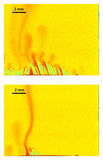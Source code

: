 \begin{figure}[htbp]
\centering
  \begin{subfigure}{0.3\textwidth}
    \centering
	\includegraphics[width=\textwidth]{Chapter4/Graphics/freckle_exp/exp_pulsing.png}
	\caption{}
    \label{fig:exp_pulsing}
  \end{subfigure}
  \begin{subfigure}{0.3\textwidth}
    \centering
	\includegraphics[width=\textwidth]{Chapter4/Graphics/freckle_exp/exp_continuous.png}
	\caption{}
    \label{fig:exp_continuous}
  \end{subfigure}
   \begin{subfigure}{0.3\textwidth}

\end{subfigure}
\end{figure}
